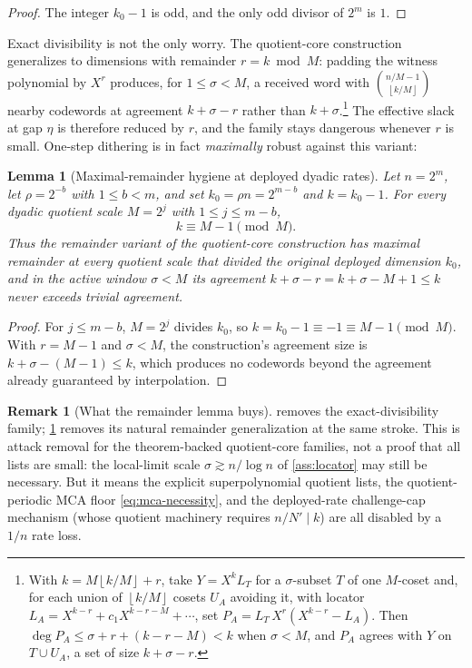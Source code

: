 \documentclass[11pt]{article}
\newtheorem{lemma}[theorem]{Lemma}
\theoremstyle{definition}
\newtheorem{remark}[theorem]{Remark}
\newcommand{\floor}[1]{\left\lfloor #1\right\rfloor}
\begin{document}
\begin{proof}
The integer $k_0-1$ is odd, and the only odd divisor of $2^m$ is $1$.
\end{proof}

Exact divisibility is not the only worry.  The quotient-core construction generalizes to dimensions with remainder $r=k\bmod M$: padding the witness polynomial by $X^r$ produces, for $1\le\sigma<M$, a received word with $\binom{n/M-1}{\floor{k/M}}$ nearby codewords at agreement $k+\sigma-r$ rather than $k+\sigma$.\footnote{With $k=M\floor{k/M}+r$, take $Y=X^kL_T$ for a $\sigma$-subset $T$ of one $M$-coset and, for each union of $\floor{k/M}$ cosets $U_A$ avoiding it, with locator $L_A=X^{k-r}+c_1X^{k-r-M}+\cdots$, set $P_A=L_T\,X^r(X^{k-r}-L_A)$.  Then $\deg P_A\le \sigma+r+(k-r-M)<k$ when $\sigma<M$, and $P_A$ agrees with $Y$ on $T\cup U_A$, a set of size $k+\sigma-r$.}  The effective slack at gap $\eta$ is therefore reduced by $r$, and the family stays dangerous whenever $r$ is small.  One-step dithering is in fact \emph{maximally} robust against this variant:

\begin{lemma}[Maximal-remainder hygiene at deployed dyadic rates]
\label{lem:max-remainder}
Let $n=2^m$, let $\rho=2^{-b}$ with $1\le b<m$, and set $k_0=\rho n=2^{m-b}$ and $k=k_0-1$.  For every dyadic quotient scale $M=2^j$ with $1\le j\le m-b$,
\[
        k\equiv M-1\pmod M .
\]
Thus the remainder variant of the quotient-core construction has maximal remainder at every quotient scale that divided the original deployed dimension $k_0$, and in the active window $\sigma<M$ its agreement $k+\sigma-r=k+\sigma-M+1\le k$ never exceeds trivial agreement.
\end{lemma}

\begin{proof}
For $j\le m-b$, $M=2^j$ divides $k_0$, so $k=k_0-1\equiv-1\equiv M-1\pmod M$.  With $r=M-1$ and $\sigma<M$, the construction's agreement size is $k+\sigma-(M-1)\le k$, which produces no codewords beyond the agreement already guaranteed by interpolation.
\end{proof}

\begin{remark}[What the remainder lemma buys]
\label{rem:remainder}
 removes the exact-divisibility family; \cref{lem:max-remainder} removes its natural remainder generalization at the same stroke.  This is attack removal for the theorem-backed quotient-core families, not a proof that all lists are small: the local-limit scale $\sigma\gtrsim n/\log n$ of \cref{ass:locator} may still be necessary.  But it means the explicit superpolynomial quotient lists, the quotient-periodic MCA floor \eqref{eq:mca-necessity}, and the deployed-rate challenge-cap mechanism (whose quotient machinery requires $n/N'\mid k$) are all disabled by a $1/n$ rate loss.
\end{remark}
\end{document}
